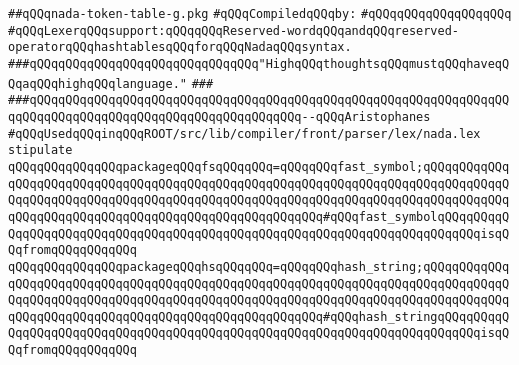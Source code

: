 \label{src/lib/compiler/front/parser/lex/nada-token-table-g.pkg}
\verb|##qQQqnada-token-table-g.pkg|\newline
\newline
\verb|#qQQqCompiledqQQqby:|\newline
\verb|#qQQqqQQqqQQqqQQqqQQq|\newline
\newline
\newline
\newline
\verb|#qQQqLexerqQQqsupport:qQQqqQQqReserved-wordqQQqandqQQqreserved-operatorqQQqhashtablesqQQqforqQQqNadaqQQqsyntax.|\newline
\newline
\newline
\newline
\verb|###qQQqqQQqqQQqqQQqqQQqqQQqqQQqqQQq"HighqQQqthoughtsqQQqmustqQQqhaveqQQqaqQQqhighqQQqlanguage."|\newline
\verb|###|\newline
\verb|###qQQqqQQqqQQqqQQqqQQqqQQqqQQqqQQqqQQqqQQqqQQqqQQqqQQqqQQqqQQqqQQqqQQqqQQqqQQqqQQqqQQqqQQqqQQqqQQqqQQqqQQqqQQq--qQQqAristophanes|\newline
\newline
\newline
\newline
\verb|#qQQqUsedqQQqinqQQqROOT/src/lib/compiler/front/parser/lex/nada.lex|\newline
\newline
\verb|stipulate|\newline
\verb|qQQqqQQqqQQqqQQqpackageqQQqfsqQQqqQQq=qQQqqQQqfast_symbol;qQQqqQQqqQQqqQQqqQQqqQQqqQQqqQQqqQQqqQQqqQQqqQQqqQQqqQQqqQQqqQQqqQQqqQQqqQQqqQQqqQQqqQQqqQQqqQQqqQQqqQQqqQQqqQQqqQQqqQQqqQQqqQQqqQQqqQQqqQQqqQQqqQQqqQQqqQQqqQQqqQQqqQQqqQQqqQQqqQQqqQQqqQQqqQQqqQQq#qQQqfast_symbolqQQqqQQqqQQqqQQqqQQqqQQqqQQqqQQqqQQqqQQqqQQqqQQqqQQqqQQqqQQqqQQqqQQqqQQqqQQqisqQQqfromqQQqqQQqqQQq|\newline
\verb|qQQqqQQqqQQqqQQqpackageqQQqhsqQQqqQQq=qQQqqQQqhash_string;qQQqqQQqqQQqqQQqqQQqqQQqqQQqqQQqqQQqqQQqqQQqqQQqqQQqqQQqqQQqqQQqqQQqqQQqqQQqqQQqqQQqqQQqqQQqqQQqqQQqqQQqqQQqqQQqqQQqqQQqqQQqqQQqqQQqqQQqqQQqqQQqqQQqqQQqqQQqqQQqqQQqqQQqqQQqqQQqqQQqqQQqqQQqqQQqqQQq#qQQqhash_stringqQQqqQQqqQQqqQQqqQQqqQQqqQQqqQQqqQQqqQQqqQQqqQQqqQQqqQQqqQQqqQQqqQQqqQQqqQQqisqQQqfromqQQqqQQqqQQq|\newline
